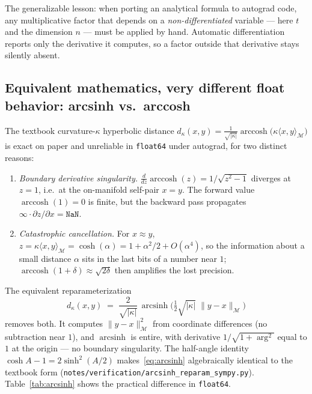 \documentclass{article}
\newcommand{\kp}{\kappa}
\newcommand{\code}[1]{\texttt{#1}}
\begin{document}
The generalizable lesson: when porting an analytical formula to autograd
code, any multiplicative factor that depends on a \emph{non-differentiated}
variable --- here $t$ and the dimension $n$ --- must be applied by hand.
Automatic differentiation reports only the derivative it computes, so a
factor outside that derivative stays silently absent.

\subsection{Equivalent mathematics, very different float behavior:
arcsinh vs.\ arccosh}
\label{sec:c3}

The textbook curvature-$\kp$ hyperbolic distance
$d_\kp(x,y) = \tfrac{1}{\sqrt{|\kp|}} \operatorname{arccosh}
\!\big(\kp \langle x, y\rangle_{\mathcal{M}}\big)$ is exact on paper and
unreliable in \code{float64} under autograd, for two distinct reasons:
\begin{enumerate}\itemsep2pt
  \item \emph{Boundary derivative singularity.}
  $\frac{d}{dz}\operatorname{arccosh}(z) = 1/\sqrt{z^2-1}$ diverges at
  $z = 1$, i.e.\ at the on-manifold self-pair $x = y$. The forward value
  $\operatorname{arccosh}(1) = 0$ is finite, but the backward pass
  propagates $\infty \cdot \partial z/\partial x = \code{NaN}$.
  \item \emph{Catastrophic cancellation.} For $x \approx y$,
  $z = \kp\langle x,y\rangle_{\mathcal M} = \cosh(\alpha) = 1 + \alpha^2/2 +
  O(\alpha^4)$, so the information about a small distance $\alpha$ sits in
  the last bits of a number near $1$; $\operatorname{arccosh}(1+\delta)
  \approx \sqrt{2\delta}$ then amplifies the lost precision.
\end{enumerate}
The equivalent reparameterization
\begin{equation}
  d_\kp(x, y) \;=\; \frac{2}{\sqrt{|\kp|}}\,
  \operatorname{arcsinh}\!\Big(\tfrac{1}{2}\sqrt{|\kp|}\;
  \lVert y - x \rVert_{\mathcal M}\Big)
  \label{eq:arcsinh}
\end{equation}
removes both. It computes $\lVert y - x\rVert_{\mathcal M}^2$ from
coordinate differences (no subtraction near $1$), and $\operatorname{arcsinh}$
is entire, with derivative $1/\sqrt{1+\arg^2}$ equal to $1$ at the origin
--- no boundary singularity. The half-angle identity
$\cosh A - 1 = 2\sinh^2(A/2)$ makes~\eqref{eq:arcsinh} algebraically
identical to the textbook form
(\code{notes/verification/arcsinh\_reparam\_sympy.py}).
Table~\ref{tab:arcsinh} shows the practical difference in \code{float64}.
\end{document}
